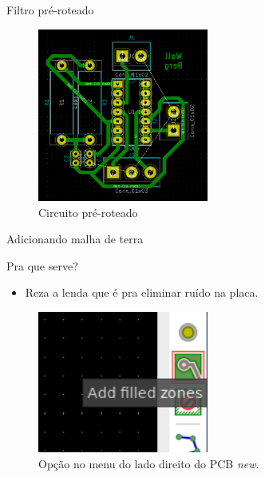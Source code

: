 \documentclass{beamer}
\begin{document}
\begin{frame}{Filtro pré-roteado}
	\begin{figure}
		\centering
		\includegraphics[width=0.5\textwidth]{Imagens/34_circuito_pre_router.png}
		\caption{Circuito pré-roteado}
	\end{figure}
\end{frame}

\begin{frame}{Adicionando malha de terra}
	\begin{block}{Pra que serve?}
		\begin{itemize}
			\item Reza a lenda que é pra eliminar ruído na placa.
		\end{itemize}
	\end{block}
	\begin{figure}
		\centering
		\includegraphics[width=0.5\textwidth]{Imagens/35_add_malha_terra.png}
		\caption{Opção no menu do lado direito do PCB \textit{new}.}
	\end{figure}
\end{frame}
\end{document}
